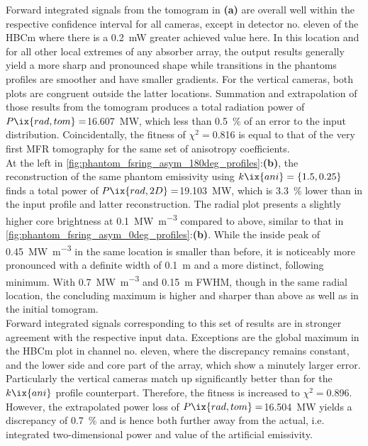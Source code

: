                 Forward integrated signals from the tomogram in \textbf{(a)} are overall well within the respective confidence interval for all cameras, except in detector no. eleven of the HBCm where there is a \SI{0.2}{\milli\watt} greater achieved value here. In this location and for all other local extremes of any absorber array, the output results generally yield a more sharp and pronounced shape while transitions in the phantoms profiles are smoother and have smaller gradients. For the vertical cameras, both plots are congruent outside the latter locations. Summation and extrapolation of those results from the tomogram produces a total radiation power of $P\ix{rad,tom}=$\SI{16.607}{\mega\watt}, which less than \SI{0.5}{\percent} of an error to the input distribution. Coincidentally, the fitness of $\chi^{2}=$\SI{0.816}{\arbitraryunit} is equal to that of the very first MFR tomography for the same set of anisotropy coefficients.\\%
                At the left in \cref{fig:phantom_fsring_asym_180deg_profiles}:\textbf{(b)}, the reconstruction of the same phantom emissivity using $k\ix{ani}=\left\{1.5, 0.25\right\}$ finds a total power of $P\ix{rad,2D}=$\SI{19.103}{\mega\watt}, which is \SI{3.3}{\percent} lower than in the input profile and latter reconstruction. The radial plot presents a slightly higher core brightness at \SI{0.1}{\mega\watt\per\cubic\meter} compared to above, similar to that in \cref{fig:phantom_fsring_asym_0deg_profiles}:\textbf{(b)}. While the inside peak of \SI{0.45}{\mega\watt\per\cubic\meter} in the same location is smaller than before, it is noticeably more pronounced with a definite width of \SI{0.1}{\meter} and a more distinct, following minimum. With \SI{0.7}{\mega\watt\per\cubic\meter} and \SI{0.15}{\meter} FWHM, though in the same radial location, the concluding maximum is higher and sharper than above as well as in the initial tomogram.\\%
                Forward integrated signals corresponding to this set of results are in stronger agreement with the respective input data. Exceptions are the global maximum in the HBCm plot in channel no. eleven, where the discrepancy remains constant, and the lower side and core part of the array, which show a minutely larger error. Particularly the vertical cameras match up significantly better than for the $k\ix{ani}$ profile counterpart. Therefore, the fitness is increased to $\chi^{2}=$\SI{0.896}{\arbitraryunit}. However, the extrapolated power loss of $P\ix{rad,tom}=$\SI{16.504}{\mega\watt} yields a discrepancy of \SI{0.7}{\percent} and is hence both further away from the actual, i.e. integrated two-dimensional power and value of the artificial emissivity.\\%
